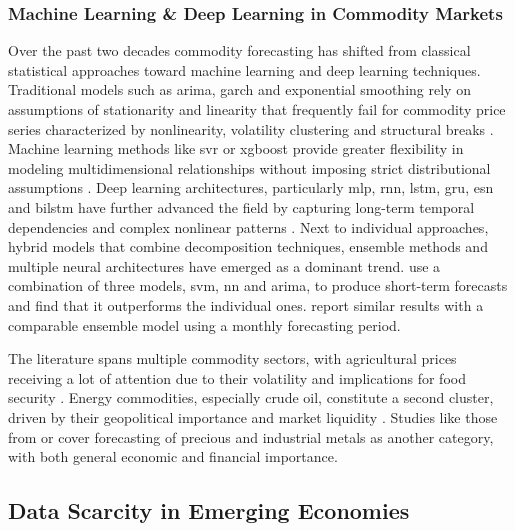 \subsubsection{Machine Learning \& Deep Learning in Commodity Markets}
Over the past two decades commodity forecasting has shifted from classical statistical approaches toward machine learning and deep learning techniques. Traditional models such as \ac{arima}, \ac{garch} and exponential smoothing rely on assumptions of stationarity and linearity that frequently fail for commodity price series characterized by nonlinearity, volatility clustering and structural breaks \parencite{foroutanDeepLearningSystems2024,sunNovelAgriculturalCommodity2025}. Machine learning methods like \ac{svr} or \ac{xgboost} provide greater flexibility in modeling multidimensional relationships without imposing strict distributional assumptions \parencite{manognaNovelHybridNeural2025}. Deep learning architectures, particularly \ac{mlp}, \ac{rnn}, \ac{lstm}, \ac{gru}, \ac{esn} and \ac{bilstm} have further advanced the field by capturing long-term temporal dependencies and complex nonlinear patterns \parencite{manognaNovelHybridNeural2025,sunNovelAgriculturalCommodity2025}. Next to individual approaches, hybrid models that combine decomposition techniques, ensemble methods and multiple neural architectures have emerged as a dominant trend. \textcite{fangOptimalForecastCombination2020} use a combination of three models, \ac{svm}, \ac{nn} and \ac{arima}, to produce short-term forecasts and find that it outperforms the individual ones. \textcite{rayARIMALSTMModelPredicting2023} report similar results with a comparable ensemble model using a monthly forecasting period.

The literature spans multiple commodity sectors, with agricultural prices receiving a lot of attention due to their volatility and implications for food security \parencite{manognaNovelHybridNeural2025,sariVariousOptimizedMachine2024}. Energy commodities, especially crude oil, constitute a second cluster, driven by their geopolitical importance and market liquidity \parencite{foroutanDeepLearningSystems2024,senForecastingCrudeOil2024,liangCrudeOilPrice2023}. Studies like those from \textcite{varshiniHowGoodAre2024} or \textcite{jinMachineLearningGold2025} cover forecasting of precious and industrial metals as another category, with both general economic and financial importance. 

\subsection{Data Scarcity in Emerging Economies}
